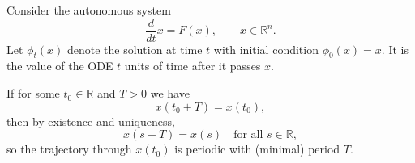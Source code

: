 \documentclass{tufte-handout}
\newcommand*\R{\mathbb{R}}
\let\O\varnothing
\newtheorem{thm}{Theorem}[subsection]
\newtheorem{notation}[thm]{Notation}
\theoremstyle{definition}
\begin{document}

Consider the autonomous system
\[
	\frac{d}{dt} x = F(x), \qquad x \in \R^n.
\]
Let $\phi_t(x)$ denote the solution at time $t$ with initial condition $\phi_0(x) = x$. It is the value of the ODE $t$ units of time after it passes $x$.

If for some $t_0 \in \R$ and $T > 0$ we have
\[
	x(t_0 + T) = x(t_0),
\]
then by existence and uniqueness,
\[
	x(s + T) = x(s) \quad \text{for all } s \in \R,
\]
so the trajectory through $x(t_0)$ is periodic with (minimal) period $T$.
\end{document}
